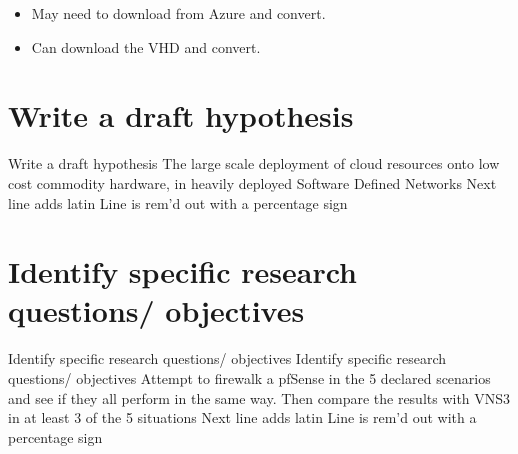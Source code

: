 \documentclass[12pt]{report}
\begin{document}
\begin{itemize}
\item May need to download from Azure and convert.	
\item Can download the VHD and convert.
\end{itemize}
\newpage
\section*{Write a draft hypothesis}

Write a draft hypothesis
\newline
The large scale deployment of cloud resources onto low cost commodity hardware, in heavily deployed 
Software Defined Networks 
\newline
Next line adds latin
Line is rem'd out with a percentage sign
\newline

\newpage
\section*{Identify specific research questions/ objectives}
Identify specific research questions/ objectives
\newline
Identify specific research questions/ objectives
Attempt to firewalk a pfSense in the 5 declared scenarios and see if they all perform in the same way.
Then compare the results with VNS3 in at least 3 of the 5 situations
\newline
Next line adds latin
Line is rem'd out with a percentage sign
\newline

\newpage
\end{document}
